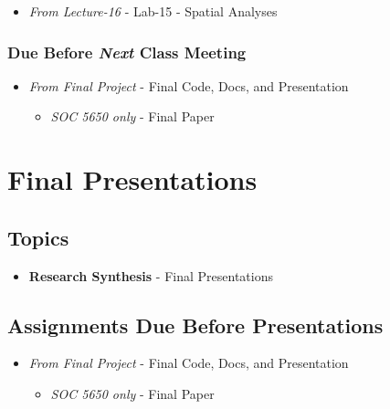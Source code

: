 \documentclass[]{book}
\providecommand{\tightlist}{%
  \setlength{\itemsep}{0pt}\setlength{\parskip}{0pt}}
\begin{document}
\begin{itemize}
\tightlist
\item
  \emph{From Lecture-16} - Lab-15 - Spatial Analyses
\end{itemize}

\hypertarget{due-before-next-class-meeting}{%
\subsubsection*{\texorpdfstring{Due Before \emph{Next} Class Meeting}{Due Before Next Class Meeting}}\label{due-before-next-class-meeting}}

\begin{itemize}
\tightlist
\item
  \emph{From Final Project} - Final Code, Docs, and Presentation

  \begin{itemize}
  \tightlist
  \item
    \emph{SOC 5650 only} - Final Paper
  \end{itemize}
\end{itemize}

\hypertarget{final-presentations}{%
\section*{Final Presentations}\label{final-presentations}}

\hypertarget{topics-18}{%
\subsection*{Topics}\label{topics-18}}

\begin{itemize}
\tightlist
\item
  \textbf{Research Synthesis} - Final Presentations
\end{itemize}

\hypertarget{assignments-due-before-presentations}{%
\subsection*{Assignments Due Before Presentations}\label{assignments-due-before-presentations}}

\begin{itemize}
\tightlist
\item
  \emph{From Final Project} - Final Code, Docs, and Presentation

  \begin{itemize}
  \tightlist
  \item
    \emph{SOC 5650 only} - Final Paper
  \end{itemize}
\end{itemize}


\end{document}
